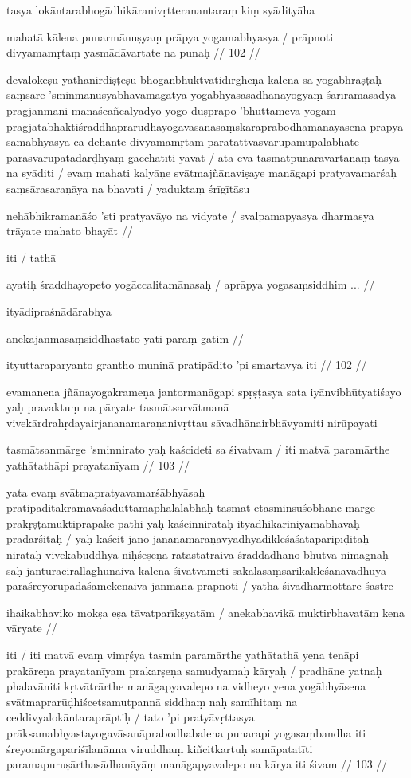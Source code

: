 tasya lokāntarabhogādhikāranivṛtteranantaraṃ kiṃ syādityāha

mahatā kālena punarmānuṣyaṃ prāpya yogamabhyasya  /
prāpnoti divyamamṛtaṃ yasmādāvartate na punaḥ  // 102  //

devalokeṣu yathānirdiṣṭeṣu bhogānbhuktvātidīrgheṇa kālena sa yogabhraṣṭaḥ saṃsāre 'sminmanuṣyabhāvamāgatya yogābhyāsasādhanayogyaṃ śarīramāsādya prāgjanmani manaścāñcalyādyo yogo duṣprāpo 'bhūttameva yogam prāgjātabhaktiśraddhāprarūḍhayogavāsanāsaṃskāraprabodhamanāyāsena prāpya samabhyasya ca dehānte divyamamṛtam paratattvasvarūpamupalabhate parasvarūpatādārḍhyaṃ gacchatīti yāvat  / ata eva tasmātpunarāvartanaṃ tasya na syāditi  / evaṃ mahati kalyāṇe svātmajñānaviṣaye manāgapi pratyavamarśaḥ saṃsārasaraṇāya na bhavati  / yaduktaṃ śrīgītāsu

nehābhikramanāśo 'sti pratyavāyo na vidyate  /
svalpamapyasya dharmasya trāyate mahato bhayāt  //

iti  / tathā

ayatiḥ śraddhayopeto yogāccalitamānasaḥ  /
aprāpya yogasaṃsiddhim  ...  //

ityādipraśnādārabhya

anekajanmasaṃsiddhastato yāti parāṃ gatim  //

ityuttaraparyanto grantho muninā pratipādito 'pi smartavya iti  // 102  //

evamanena jñānayogakrameṇa jantormanāgapi spṛṣṭasya sata iyānvibhūtyatiśayo yaḥ pravaktuṃ na pāryate tasmātsarvātmanā vivekārdrahṛdayairjananamaraṇanivṛttau sāvadhānairbhāvyamiti nirūpayati

tasmātsanmārge 'sminnirato yaḥ kaścideti sa śivatvam  /
iti matvā paramārthe yathātathāpi prayatanīyam  // 103  //

yata evaṃ svātmapratyavamarśābhyāsaḥ pratipāditakramavaśāduttamaphalalābhaḥ tasmāt etasminsuśobhane mārge prakṛṣṭamuktiprāpake pathi yaḥ kaścinnirataḥ ityadhikāriniyamābhāvaḥ pradarśitaḥ  / yaḥ kaścit jano jananamaraṇavyādhyādikleśaśataparipīḍitaḥ nirataḥ vivekabuddhyā niḥśeṣeṇa ratastatraiva śraddadhāno bhūtvā nimagnaḥ saḥ janturacirāllaghunaiva kālena śivatvameti sakalasāṃsārikakleśānavadhūya paraśreyorūpadaśāmekenaiva janmanā prāpnoti  / yathā śivadharmottare śāstre

ihaikabhaviko mokṣa eṣa tāvatparīkṣyatām  /
anekabhavikā muktirbhavatāṃ kena vāryate  //

iti  / iti matvā evaṃ vimṛśya tasmin paramārthe yathātathā yena tenāpi prakāreṇa prayatanīyam prakarṣeṇa samudyamaḥ kāryaḥ  / pradhāne yatnaḥ phalavāniti kṛtvātrārthe manāgapyavalepo na vidheyo yena yogābhyāsena svātmaprarūḍhiścetsamutpannā siddhaṃ naḥ samīhitaṃ na ceddivyalokāntaraprāptiḥ  / tato 'pi pratyāvṛttasya prāksamabhyastayogavāsanāprabodhabalena punarapi yogasaṃbandha iti śreyomārgapariśīlanānna viruddhaṃ kiñcitkartuḥ samāpatatīti paramapuruṣārthasādhanāyāṃ manāgapyavalepo na kārya iti śivam  // 103  //

